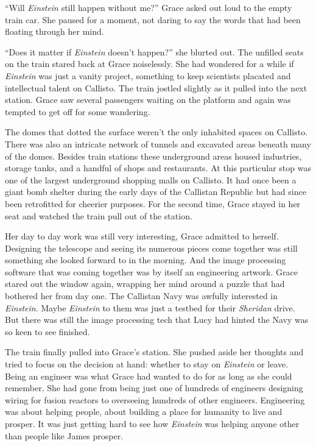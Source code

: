 \documentclass[openany, 12pt]{book} %
\begin{document}
``Will \textit{Einstein} still happen without me?'' Grace asked out loud to the empty train car. She paused for a moment, not daring to say the words that had been floating through her mind.

``Does it matter if \textit{Einstein} doesn't happen?'' she blurted out. The unfilled seats on the train stared back at Grace noiselessly. She had wondered for a while if \textit{Einstein} was just a vanity project, something to keep scientists placated and intellectual talent on Callisto. The train jostled slightly as it pulled into the next station. Grace saw several passengers waiting on the platform and again was tempted to get off for some wandering.

The domes that dotted the surface weren't the only inhabited spaces on Callisto. There was also an intricate network of tunnels and excavated areas beneath many of the domes. Besides train stations these underground areas housed industries, storage tanks, and a handful of shops and restaurants. At this particular stop was one of the largest underground shopping malls on Callisto. It had once been a giant bomb shelter during the early days of the Callistan Republic but had since been retrofitted for cheerier purposes. For the second time, Grace stayed in her seat and watched the train pull out of the station.

Her day to day work was still very interesting, Grace admitted to herself. Designing the telescope and seeing its numerous pieces come together was still something she looked forward to in the morning. And the image processing software that was coming together was by itself an engineering artwork. Grace stared out the window again, wrapping her mind around a puzzle that had bothered her from day one. The Callistan Navy was awfully interested in \textit{Einstein}. Maybe \textit{Einstein} to them was just a testbed for their \textit{Sheridan} drive. But there was still the image processing tech that Lucy had hinted the Navy was so keen to see finished.

The train finally pulled into Grace's station. She pushed aside her thoughts and tried to focus on the decision at hand: whether to stay on \textit{Einstein} or leave. Being an engineer was what Grace had wanted to do for as long as she could remember. She had gone from being just one of hundreds of engineers designing wiring for fusion reactors to overseeing hundreds of other engineers. Engineering was about helping people, about building a place for humanity to live and prosper. It was just getting hard to see how \textit{Einstein} was helping anyone other than people like James prosper.
\end{document}
